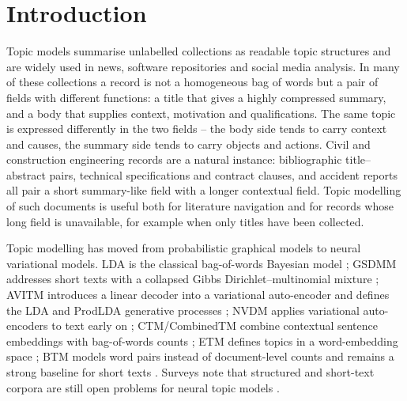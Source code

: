 \documentclass[Journal,letterpaper,NoLists]{ascelike-new}
\begin{document}

\section{Introduction}

Topic models summarise unlabelled collections as readable topic structures and are widely used in
news, software repositories and social media analysis. In many of these collections a record is not
a homogeneous bag of words but a pair of fields with different functions: a title that gives a
highly compressed summary, and a body that supplies context, motivation and qualifications. The
same topic is expressed differently in the two fields -- the body side tends to carry context and
causes, the summary side tends to carry objects and actions. Civil and construction engineering
records are a natural instance: bibliographic title--abstract pairs, technical specifications and
contract clauses, and accident reports all pair a short summary-like field with a longer contextual
field. Topic modelling of such documents is useful both for literature navigation and for records
whose long field is unavailable, for example when only titles have been collected.

Topic modelling has moved from probabilistic graphical models to neural variational models. LDA is
the classical bag-of-words Bayesian model \cite{blei2003lda}; GSDMM addresses short texts with a
collapsed Gibbs Dirichlet--multinomial mixture \cite{yin2014gsdmm}; AVITM introduces a linear
decoder into a variational auto-encoder and defines the LDA and ProdLDA generative processes
\cite{srivastava2017avitm}; NVDM applies variational auto-encoders to text early on
\cite{miao2016nvdm}; CTM/CombinedTM combine contextual sentence embeddings with bag-of-words
counts \cite{bianchi2021ctm}; ETM defines topics in a word-embedding space \cite{dieng2020etm};
BTM models word pairs instead of document-level counts and remains a strong baseline for short
texts \cite{yan2013btm}. Surveys note that structured and short-text corpora are still open
problems for neural topic models \cite{wu2024survey}.
\end{document}
